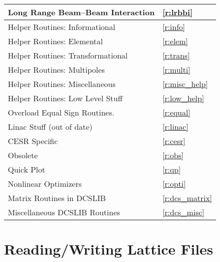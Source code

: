 \begin{center}
\begin{tabular}{|l|l|}
 	Long Range Beam--Beam Interaction       & \ref{r:lrbbi}      \\ \hline
 	Helper Routines: Informational          & \ref{r:info}       \\ \hline
 	Helper Routines: Elemental              & \ref{r:elem}       \\ \hline
 	Helper Routines: Transformational       & \ref{r:trans}      \\ \hline
 	Helper Routines: Multipoles             & \ref{r:multi}      \\ \hline
 	Helper Routines: Miscellaneous          & \ref{r:misc_help}  \\ \hline
 	Helper Routines: Low Level Stuff        & \ref{r:low_help}   \\ \hline
 	Overload Equal Sign Routines.           & \ref{r:equal}      \\ \hline
 	Linac Stuff (out of date)               & \ref{r:linac}      \\ \hline
 	CESR Specific                           & \ref{r:cesr}       \\ \hline
 	Obsolete                                & \ref{r:obs}        \\ \hline \hline
  Quick Plot                              & \ref{r:qp}         \\ \hline
  Nonlinear Optimizers                    & \ref{r:opti}       \\ \hline
  Matrix Routines in DCSLIB               & \ref{r:dcs_matrix} \\ \hline
  Miscellaneous DCSLIB Routines           & \ref{r:dcs_misc}   \\ \hline
\end{tabular}
\end{center}
\toffset

\section{Reading/Writing Lattice Files} 
\label{r:read}

